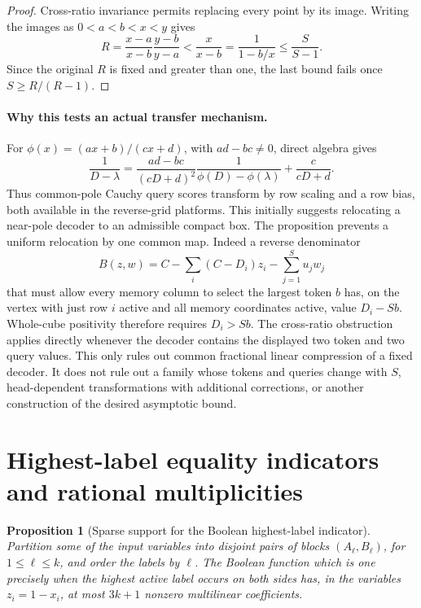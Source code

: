 \documentclass[11pt]{article}
\newtheorem{proposition}[theorem]{Proposition}
\begin{document}
\begin{proof}
Cross-ratio invariance permits replacing every point by its image.
Writing the images as $0<a<b<x<y$ gives
\[
 R=\frac{x-a}{x-b}\frac{y-b}{y-a}
   <\frac{x}{x-b}
   =\frac1{1-b/x}\le\frac S{S-1}.
\]
Since the original $R$ is fixed and greater than one, the last bound
fails once $S\ge R/(R-1)$.
\end{proof}

\paragraph{Why this tests an actual transfer mechanism.}
For $\phi(x)=(ax+b)/(cx+d)$, with $ad-bc\ne0$, direct algebra gives
\[
 \frac1{D-\lambda}
 =\frac{ad-bc}{(cD+d)^2}
       \frac1{\phi(D)-\phi(\lambda)}
       +\frac c{cD+d}.
\]
Thus common-pole Cauchy query scores transform by row scaling and a
row bias, both available in the reverse-grid platforms. This initially
suggests relocating a near-pole decoder to an admissible compact box.
The proposition prevents a uniform relocation by one common map.
Indeed a reverse denominator
\[
 B(z,w)=C-\sum_i(C-D_i)z_i-\sum_{j=1}^S u_jw_j
\]
that must allow every memory column to select the largest token $b$
has, on the vertex with just row $i$ active and all memory coordinates
active, value $D_i-Sb$. Whole-cube positivity therefore requires
$D_i>Sb$. The cross-ratio obstruction applies directly whenever the
decoder contains the displayed two token and two query values.
This only rules out common fractional linear compression of a fixed
decoder. It does not rule out a family whose tokens and queries change
with $S$, head-dependent transformations with additional corrections,
or another construction of the desired asymptotic bound.

\section{Highest-label equality indicators and rational multiplicities}

\begin{proposition}[Sparse support for the Boolean highest-label indicator]
Partition some of the input variables into disjoint pairs of blocks
$(A_\ell,B_\ell)$, for $1\le\ell\le k$, and order the labels by
$\ell$. The Boolean function which is one precisely when the highest
active label occurs on both sides has, in the variables $z_i=1-x_i$,
at most $3k+1$ nonzero multilinear coefficients.
\end{proposition}
\end{document}
